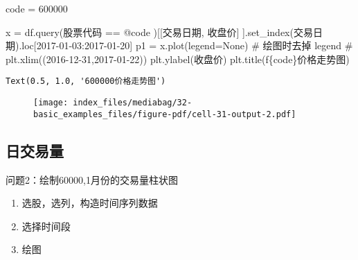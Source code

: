 \documentclass[
  letterpaper,
  DIV=11,
  numbers=noendperiod]{scrreprt}
\newenvironment{Shaded}{\begin{snugshade}}{\end{snugshade}}
\newcommand{\CommentTok}[1]{\textcolor[rgb]{0.37,0.37,0.37}{#1}}
\newcommand{\NormalTok}[1]{\textcolor[rgb]{0.00,0.23,0.31}{#1}}
\newcommand{\OperatorTok}[1]{\textcolor[rgb]{0.37,0.37,0.37}{#1}}
\newcommand{\SpecialCharTok}[1]{\textcolor[rgb]{0.37,0.37,0.37}{#1}}
\newcommand{\SpecialStringTok}[1]{\textcolor[rgb]{0.13,0.47,0.30}{#1}}
\newcommand{\StringTok}[1]{\textcolor[rgb]{0.13,0.47,0.30}{#1}}
\newcommand{\VariableTok}[1]{\textcolor[rgb]{0.07,0.07,0.07}{#1}}
\providecommand{\tightlist}{%
  \setlength{\itemsep}{0pt}\setlength{\parskip}{0pt}}\usepackage{longtable,booktabs,array}
\begin{document}
\begin{Shaded}
\begin{Highlighting}[]
\NormalTok{code }\OperatorTok{=} \StringTok{\textquotesingle{}600000\textquotesingle{}}

\NormalTok{x }\OperatorTok{=}\NormalTok{ df.query(}\StringTok{\textquotesingle{}股票代码 == @code \textquotesingle{}}\NormalTok{)[[}\StringTok{\textquotesingle{}交易日期\textquotesingle{}}\NormalTok{, }\StringTok{\textquotesingle{}收盘价\textquotesingle{}}\NormalTok{]}
\NormalTok{                               ].set\_index(}\StringTok{\textquotesingle{}交易日期\textquotesingle{}}\NormalTok{).loc[}\StringTok{\textquotesingle{}2017{-}01{-}03\textquotesingle{}}\NormalTok{:}\StringTok{\textquotesingle{}2017{-}01{-}20\textquotesingle{}}\NormalTok{]}
\NormalTok{p1 }\OperatorTok{=}\NormalTok{ x.plot(legend}\OperatorTok{=}\VariableTok{None}\NormalTok{)  }\CommentTok{\# 绘图时去掉 legend}
\CommentTok{\# plt.xlim((\textquotesingle{}2016{-}12{-}31\textquotesingle{},\textquotesingle{}2017{-}01{-}22\textquotesingle{}))}
\NormalTok{plt.ylabel(}\StringTok{\textquotesingle{}收盘价\textquotesingle{}}\NormalTok{)}
\NormalTok{plt.title(}\SpecialStringTok{f\textquotesingle{}}\SpecialCharTok{\{}\NormalTok{code}\SpecialCharTok{\}}\SpecialStringTok{价格走势图\textquotesingle{}}\NormalTok{)}
\end{Highlighting}
\end{Shaded}

\begin{verbatim}
Text(0.5, 1.0, '600000价格走势图')
\end{verbatim}

\begin{figure}[H]

{\centering \texttt{[image: index\_files/mediabag/32-basic\_examples\_files/figure-pdf/cell-31-output-2.pdf]}

}

\end{figure}

\hypertarget{ux65e5ux4ea4ux6613ux91cf}{%
\subsection{日交易量}\label{ux65e5ux4ea4ux6613ux91cf}}

问题2：绘制60000,1月份的交易量柱状图

\begin{enumerate}
\def\labelenumi{\arabic{enumi}.}
\tightlist
\item
  选股，选列，构造时间序列数据
\item
  选择时间段
\item
  绘图
\end{enumerate}
\end{document}

